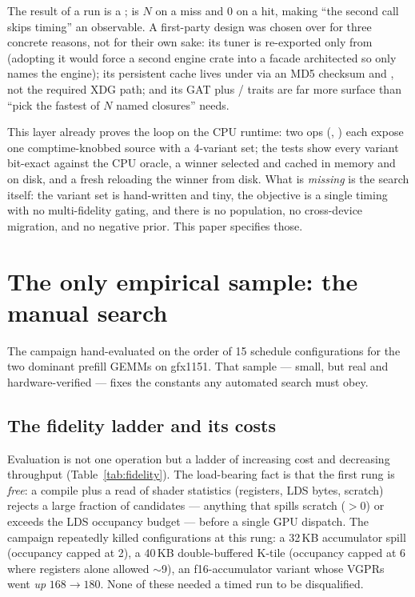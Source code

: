 \documentclass[11pt]{article}
\begin{document}
The result of a run is a ;  is $N$
on a miss and $0$ on a hit, making ``the second call skips timing'' an observable. A first-party design was
chosen over  for three concrete reasons, not for their own sake: its tuner is
re-exported only from  (adopting it would force a second engine crate into a facade
architected so only  names the engine); its persistent cache lives under  via
an MD5 checksum and , not the required XDG path; and its  GAT plus
/ traits are far more surface than ``pick the fastest of $N$ named
closures'' needs.

This layer already proves the loop on the CPU runtime: two ops (, )
each expose one comptime-knobbed source with a 4-variant set; the tests show every variant bit-exact against
the CPU oracle, a winner selected and cached in memory and on disk, and a fresh  reloading the
winner from disk. What is \emph{missing} is the search itself: the variant set is hand-written and tiny, the
objective is a single timing with no multi-fidelity gating, and there is no population, no cross-device
migration, and no negative prior. This paper specifies those.

\section{The only empirical sample: the manual search}
\label{sec:handsearch}

The campaign hand-evaluated on the order of 15 schedule configurations for the two dominant prefill GEMMs on
gfx1151. That sample --- small, but real and hardware-verified --- fixes the constants any automated search
must obey.

\subsection{The fidelity ladder and its costs}
\label{sec:fidelity}

Evaluation is not one operation but a ladder of increasing cost and decreasing throughput (Table~\ref{tab:fidelity}).
The load-bearing fact is that the first rung is \emph{free}: a compile plus a read of shader statistics
(registers, LDS bytes, scratch) rejects a large fraction of candidates --- anything that spills scratch
($>0$) or exceeds the LDS occupancy budget --- before a single GPU dispatch. The campaign repeatedly killed
configurations at this rung: a 32\,KB accumulator spill (occupancy capped at 2), a 40\,KB double-buffered
K-tile (occupancy capped at 6 where registers alone allowed $\sim$9), an f16-accumulator variant whose VGPRs
went \emph{up} $168\to180$. None of these needed a timed run to be disqualified.
\end{document}
